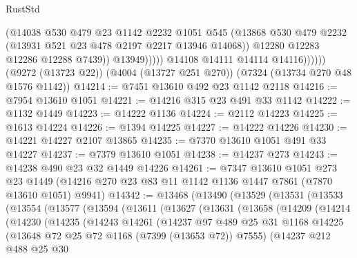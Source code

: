 \begin{lexlean}{RustStd}
\begin{coremodule}
                            (@14038
                              @530
                              @479
                              @23
                              @1142
                              @2232
                              @1051
                              @545
                              (@13868
                                @530
                                @479
                                @2232
                                (@13931 @521 @23 @478 @2197 @2217 @13946 @14068))
                              @12280
                              @12283
                              @12286
                              @12288
                              @7439))
                          @13949)))))
                @14108
                @14111
                @14114
                @14116))))))
    (@9272 (@13723 @22))
    (@4004 (@13727 @251 @270))
    (@7324 (@13734 @270 @48 @1576 @1142))
@14214 := @7451 @13610 @492 @23 @1142 @2118
@14216 := @7954 @13610 @1051
@14221 := @14216 @315 @23 @491 @33 @1142
@14222 := @1132 @1449
@14223 := @14222 @1136
@14224 := @2112 @14223
@14225 := @1613 @14224
@14226 := @1394 @14225
@14227 := @14222 @14226
@14230 := @14221 @14227 @2107 @13865
@14235 := @7370 @13610 @1051 @491 @33 @14227
@14237 := @7379 @13610 @1051
@14238 := @14237 @273
@14243 := @14238 @490 @23 @32 @1449 @14226
@14261 := @7347
    @13610
    @1051
    @273
    @23
    @1449
    (@14216 @270 @23 @83 @11 @1142 @1136 @1447 @7861 (@7870 @13610 @1051) @9941)
@14342 := @13468
    (@13490
      (@13529
        (@13531
          (@13533
            (@13554
              (@13577
                (@13594
                  (@13611
                    (@13627
                      (@13631
                        (@13658
                          (@14209
                            (@14214
                              (@14230
                                (@14235
                                  (@14243
                                    @14261
                                    (@14237
                                      @97
                                      @489
                                      @25
                                      @31
                                      @1168
                                      @14225
                                      (@13648 @72 @25 @72 @1168 (@7399 (@13653 @72)) @7555)
                                      (@14237
                                        @212
                                        @488
                                        @25
                                        @30

\end{coremodule}
\end{lexlean}
